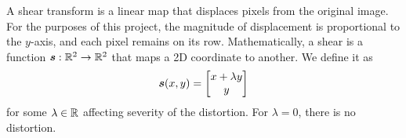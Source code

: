 \documentclass[../report.tex]{subfiles}
\begin{document}
A shear transform is a linear map that displaces pixels from the original image. 
For the purposes of this project, the magnitude of displacement is proportional to the $y$-axis, and each pixel remains on its row.
Mathematically, a shear is a function ${\bm{s}} : \mathbb{R}^2 \to \mathbb{R}^2$ that maps a 2D coordinate to another.
We define it as
\begin{equation}
    {\bm{s}}(x,y) = \begin{bmatrix}
        x + \lambda y \\ y
    \end{bmatrix}
\end{equation}
for some $\lambda \in \mathbb{R}$ affecting severity of the distortion.
For $\lambda=0$, there is no distortion.
\begin{figure}
    \centering
    \begin{subfigure}[b]{0.47\textwidth}
\end{subfigure}
\end{figure}
\end{document}
